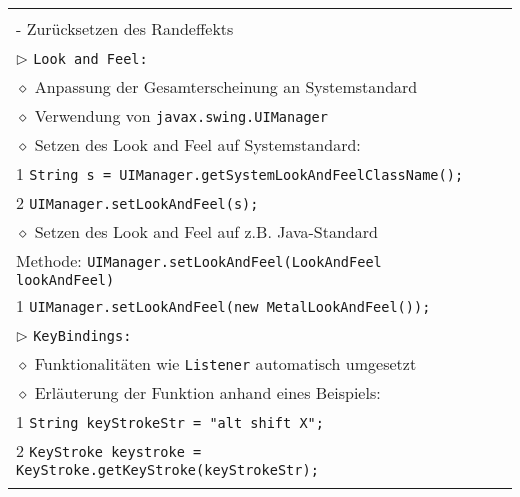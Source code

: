 \begin{longtable}{ | p{} p{} | }
{	\hspace{0.6cm} - \texttt{BorderFactory.createEmptyBorder()} \\
	\hspace{0.8cm} - Zurücksetzen des Randeffekts \\
	$\rhd$ \texttt{Look and Feel:} \\
	\hspace{0.4cm} $\diamond$ Anpassung der Gesamterscheinung an Systemstandard \\
	\hspace{0.4cm} $\diamond$ Verwendung von \texttt{javax.swing.UIManager} \\
	\hspace{0.4cm} $\diamond$ Setzen des Look and Feel auf Systemstandard: \\
	\hspace{0.8cm} 1 \hspace{0.1cm} \texttt{String s = UIManager.getSystemLookAndFeelClassName();}  \\
	\hspace{0.8cm} 2 \hspace{0.1cm} \texttt{UIManager.setLookAndFeel(s);} \\
	\hspace{0.4cm} $\diamond$ Setzen des Look and Feel auf z.B. Java-Standard \\
	\hspace{0.8cm} Methode: \texttt{UIManager.setLookAndFeel(LookAndFeel lookAndFeel)} \\
	\hspace{0.8cm} 1 \hspace{0.1cm} \texttt{UIManager.setLookAndFeel(new MetalLookAndFeel());}  \\
	$\rhd$ \texttt{KeyBindings:} \\
	\hspace{0.4cm} $\diamond$ Funktionalitäten wie \texttt{Listener} automatisch umgesetzt \\
	\hspace{0.4cm} $\diamond$ Erläuterung der Funktion anhand eines Beispiels: \\
	\hspace{0.8cm} 1 \hspace{0.1cm} \texttt{String keyStrokeStr = \string"alt shift X\string";} \\
    \hspace{0.8cm} 2 \hspace{0.1cm} \texttt{KeyStroke keystroke = KeyStroke.getKeyStroke(keyStrokeStr);} \\
}
\end{longtable}
